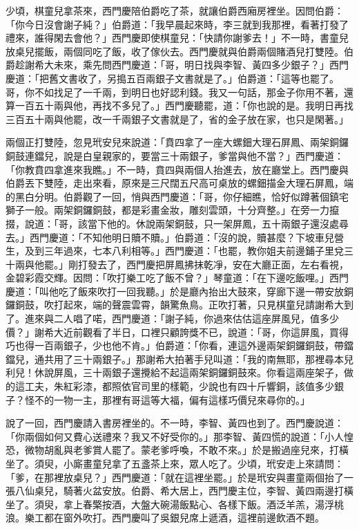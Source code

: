 少頃，棋童兒拿茶來，西門慶陪伯爵吃了茶，就讓伯爵西廂房裡坐。因問伯爵：「你今日沒會謝子純？」伯爵道：「我早晨起來時，李三就到我那裡，看著打發了禮來，誰得閑去會他？」西門慶即使棋童兒：「快請你謝爹去！」不一時，書童兒放桌兒擺飯，兩個同吃了飯，收了傢伙去。西門慶就與伯爵兩個賭酒兒打雙陸。伯爵趁謝希大未來，乘先問西門慶道：「哥，明日找與李智、黃四多少銀子？」西門慶道：「把舊文書收了，另搗五百兩銀子文書就是了。」伯爵道：「這等也罷了。哥，你不如找足了一千兩，到明日也好認利錢。我又一句話，那金子你用不著，還算一百五十兩與他，再找不多兒了。」西門慶聽罷，道：「你也說的是。我明日再找三百五十兩與他罷，改一千兩銀子文書就是了，省的金子放在家，也只是閑著。」

兩個正打雙陸，忽見玳安兒來說道：「賁四拿了一座大螺鈿大理石屏鳳、兩架銅鑼銅鼓連鐺兒，說是白皇親家的，要當三十兩銀子，爹當與他不當？」西門慶道： 「你教賁四拿進來我瞧。」不一時，賁四與兩個人抬進去，放在廳堂上。西門慶與伯爵丟下雙陸，走出來看，原來是三尺闊五尺高可桌放的螺鈿描金大理石屏鳳，端的黑白分明。伯爵觀了一回，悄與西門慶道：「哥，你仔細瞧，恰好似蹲著個鎮宅獅子一般。兩架銅鑼銅鼓，都是彩畫金妝，雕刻雲頭，十分齊整。」在旁一力攛掇，說道：「哥，該當下他的。休說兩架銅鼓，只一架屏鳳，五十兩銀子還沒處尋去。」西門慶道：「不知他明日贖不贖。」伯爵道：「沒的說，贖甚麼？下坡車兒營生，及到三年過來，七本八利相等。」西門慶道：「也罷，教你姐夫前邊鋪子里兌三十兩與他罷。」剛打發去了，西門慶把屏鳳拂抹乾凈，安在大廳正面，左右看視，金碧彩霞交輝。因問：「吹打樂工吃了飯不曾？」琴童道：「在下邊吃飯哩。」西門慶道：「叫他吃了飯來吹打一回我聽。」於是廳內抬出大鼓來，穿廊下邊一帶安放銅鑼銅鼓，吹打起來，端的聲震雲霄，韻驚魚鳥。正吹打著，只見棋童兒請謝希大到了。進來與二人唱了喏，西門慶道：「謝子純，你過來估估這座屏風兒，值多少價？」謝希大近前觀看了半日，口裡只顧誇獎不已，說道：「哥，你這屏風，買得巧也得一百兩銀子，少也他不肯。」伯爵道：「你看，連這外邊兩架銅鑼銅鼓，帶鐺鐺兒，通共用了三十兩銀子。」那謝希大拍著手兒叫道：「我的南無耶，那裡尋本兒利兒！休說屏風，三十兩銀子還攪給不起這兩架銅鑼銅鼓來。你看這兩座架子，做的這工夫，朱紅彩漆，都照依官司里的樣範，少說也有四十斤響銅，該值多少銀子？怪不的一物一主，那裡有哥這等大福，偏有這樣巧價兒來尋你的。」

說了一回，西門慶請入書房裡坐的。不一時，李智、黃四也到了。西門慶說道：「你兩個如何又費心送禮來？我又不好受你的。」那李智、黃四慌的說道：「小人惶恐，微物胡亂與老爹賞人罷了。蒙老爹呼喚，不敢不來。」於是搬過座兒來，打橫坐了。須臾，小廝畫童兒拿了五盞茶上來，眾人吃了。少頃，玳安走上來請問： 「爹，在那裡放桌兒？」西門慶道：「就在這裡坐罷。」於是玳安與畫童兩個抬了一張八仙桌兒，騎著火盆安放。伯爵、希大居上，西門慶主位，李智、黃四兩邊打橫坐了。須臾，拿上春檠按酒，大盤大碗湯飯點心、各樣下飯。酒泛羊羔，湯浮桃浪。樂工都在窗外吹打。西門慶叫了吳銀兒席上遞酒，這裡前邊飲酒不題。

